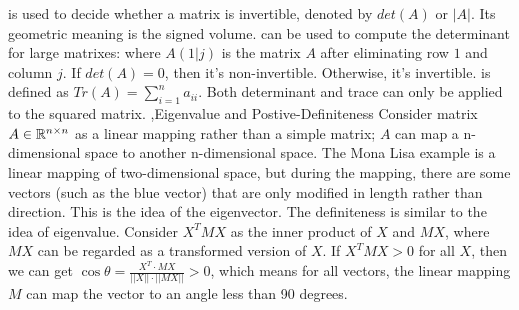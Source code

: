 \documentclass[10pt]{report}
\begin{document}
 is used to decide whether a matrix is invertible, denoted by $det(A)$ or $|A|$. Its geometric meaning is the signed volume.  can be used to compute the determinant for large matrixes:
where $A(1|j)$ is the matrix $A$ after eliminating row $1$ and column $j$. If $det(A)=0$, then it's non-invertible. Otherwise, it's invertible.  is defined as $Tr(A)=\sum_{i=1}^n a_{ii}$. Both determinant and trace can only be applied to the squared matrix.
\sep{Eigenvalue and Postive-Definiteness}
Consider matrix $A\in \RR^{n\times n}$ as a linear mapping rather than a simple matrix; $A$ can map a n-dimensional space to another n-dimensional space.
The Mona Lisa example is a linear mapping of two-dimensional space, but during the mapping, there are some vectors (such as the blue vector) that are only modified in length rather than direction. This is the idea of the eigenvector.
The definiteness is similar to the idea of eigenvalue. Consider $X^T MX$ as the inner product of $X$ and $MX$, where $MX$ can be regarded as a transformed version of $X$. If $X^T MX>0$ for all $X$, then we can get $\cos \theta=\frac{X^T \cdot MX}{||X||\cdot ||MX||}>0$, which means for all vectors, the linear mapping $M$ can map the vector to an angle less than 90 degrees.
\end{document}
